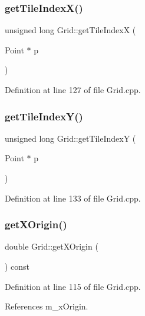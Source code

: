 \mbox{\label{class_grid_a960e14ae534b8f868910b410be06352a}} 
\subsubsection{get\+Tile\+Index\+X()}
{\footnotesize\ttfamily unsigned long Grid\+::get\+Tile\+IndexX (\begin{DoxyParamCaption}\item[{Point $\ast$}]{p }\end{DoxyParamCaption})}



Definition at line 127 of file Grid.\+cpp.

\mbox{\label{class_grid_adf39c1131c0ca762d284b6a5bf2bb29a}} 
\subsubsection{get\+Tile\+Index\+Y()}
{\footnotesize\ttfamily unsigned long Grid\+::get\+Tile\+IndexY (\begin{DoxyParamCaption}\item[{Point $\ast$}]{p }\end{DoxyParamCaption})}



Definition at line 133 of file Grid.\+cpp.

\mbox{\label{class_grid_a08b534c7f8e1099a6903bf08d9727842}} 
\subsubsection{get\+X\+Origin()}
{\footnotesize\ttfamily double Grid\+::get\+X\+Origin (\begin{DoxyParamCaption}{ }\end{DoxyParamCaption}) const}



Definition at line 115 of file Grid.\+cpp.



References m\+\_\+x\+Origin.

\mbox{\label{class_grid_a1c5b9ad91fac264bcdd67f99bc93f663}} 
